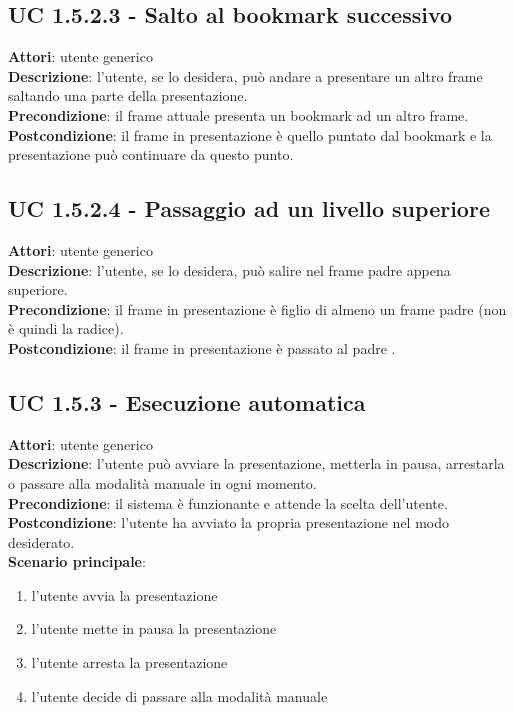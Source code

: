 	\subsection{UC 1.5.2.3 - Salto al bookmark successivo}{
		\label{uc1.5.2.3}
		\textbf{Attori}: utente generico \\
		\textbf{Descrizione}: l'utente, se lo desidera, può andare a presentare un altro frame saltando una parte della presentazione. \\
		\textbf{Precondizione}: il frame attuale presenta un bookmark ad un altro frame.	\\
		\textbf{Postcondizione}: il frame in presentazione è quello puntato dal bookmark e la presentazione può continuare da questo punto.	\\
	}
	\subsection{UC 1.5.2.4 - Passaggio ad un livello superiore}{
		\label{uc1.5.2.4}
		\textbf{Attori}: utente generico \\
		\textbf{Descrizione}: l'utente, se lo desidera, può salire nel frame padre appena superiore. \\
		\textbf{Precondizione}: il frame in presentazione è figlio di almeno un frame padre (non è quindi la radice).	\\
		\textbf{Postcondizione}: il frame in presentazione è passato al padre .	\\
	}
\subsection{UC 1.5.3 - Esecuzione automatica}{
	\label{uc1.5.3}
	\textbf{Attori}: utente generico \\
	\textbf{Descrizione}: l'utente può avviare la presentazione, metterla in pausa, arrestarla o passare alla modalità manuale in ogni momento. \\
	\textbf{Precondizione}: il sistema è funzionante e attende la scelta dell'utente. \\
	\textbf{Postcondizione}: l'utente ha avviato la propria presentazione nel modo desiderato.	\\
	\textbf{Scenario principale}:
	\begin{enumerate}
		\item l'utente avvia la presentazione
		\item l'utente mette in pausa la presentazione
		\item l'utente arresta la presentazione
		\item l'utente decide di passare alla modalità manuale
	\end{enumerate}
	}
